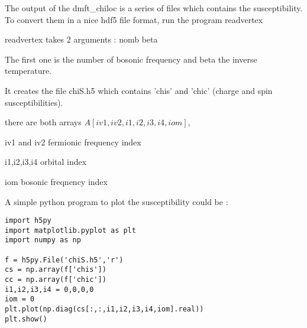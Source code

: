 \documentclass{book}
\begin{document}
\begin{enumerate}
The output of the dmft\_chiloc is a series of files which contains the susceptibility. To convert them in a nice hdf5 file format, run the program readvertex

readvertex takes 2 arguments : nomb beta

The first one is the number of bosonic frequency and beta the inverse temperature.

It creates the file chiS.h5 which contains 'chis' and 'chic' (charge and spin susceptibilities).

there are both arrays $A[iv1,iv2,i1,i2,i3,i4,iom]$,

iv1 and iv2 fermionic frequency index

i1,i2,i3,i4 orbital index

iom bosonic freqnency index
\end{enumerate}


A simple python program to plot the susceptibility could be  :

\begin{lstlisting}
import h5py
import matplotlib.pyplot as plt
import numpy as np

f = h5py.File('chiS.h5','r')
cs = np.array(f['chis'])
cc = np.array(f['chic'])
i1,i2,i3,i4 = 0,0,0,0
iom = 0
plt.plot(np.diag(cs[:,:,i1,i2,i3,i4,iom].real))
plt.show()
\end{lstlisting}
\end{document}
